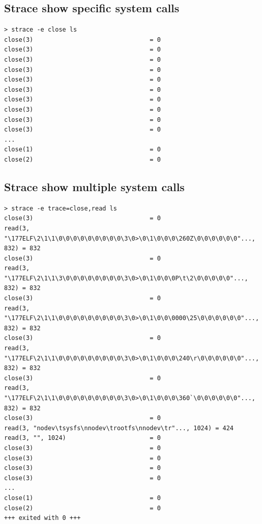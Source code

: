 \documentclass[10pt]{article}
\begin{document}
\subsection{Strace show specific system calls}
\begin{verbatim}
> strace -e close ls
close(3)                                = 0
close(3)                                = 0
close(3)                                = 0
close(3)                                = 0
close(3)                                = 0
close(3)                                = 0
close(3)                                = 0
close(3)                                = 0
close(3)                                = 0
close(3)                                = 0
...
close(1)                                = 0
close(2)                                = 0
\end{verbatim}

\subsection{Strace show multiple system calls}
\begin{verbatim}
> strace -e trace=close,read ls
close(3)                                = 0
read(3, "\177ELF\2\1\1\0\0\0\0\0\0\0\0\0\3\0>\0\1\0\0\0\260Z\0\0\0\0\0\0"..., 832) = 832
close(3)                                = 0
read(3, "\177ELF\2\1\1\3\0\0\0\0\0\0\0\0\3\0>\0\1\0\0\0P\t\2\0\0\0\0\0"..., 832) = 832
close(3)                                = 0
read(3, "\177ELF\2\1\1\0\0\0\0\0\0\0\0\0\3\0>\0\1\0\0\0000\25\0\0\0\0\0\0"..., 832) = 832
close(3)                                = 0
read(3, "\177ELF\2\1\1\0\0\0\0\0\0\0\0\0\3\0>\0\1\0\0\0\240\r\0\0\0\0\0\0"..., 832) = 832
close(3)                                = 0
read(3, "\177ELF\2\1\1\0\0\0\0\0\0\0\0\0\3\0>\0\1\0\0\0\360`\0\0\0\0\0\0"..., 832) = 832
close(3)                                = 0
read(3, "nodev\tsysfs\nnodev\trootfs\nnodev\tr"..., 1024) = 424
read(3, "", 1024)                       = 0
close(3)                                = 0
close(3)                                = 0
close(3)                                = 0
close(3)                                = 0
...
close(1)                                = 0
close(2)                                = 0
+++ exited with 0 +++
\end{verbatim}
\end{document}
